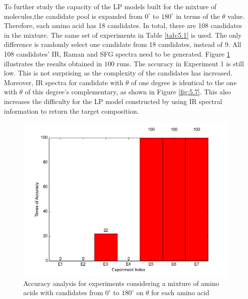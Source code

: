 
To further study the capacity of the LP models built for the mixture of molecules,the candidate pool is expanded from $0^{\circ}$ to $180^{\circ}$ in terms of the $\theta$ value. Therefore, each amino acid has 18 candidates. In total, there are 108 candidates in the mixture. The same set of experiments in Table \ref{tab:5.1} is used. The only difference is randomly select one candidate from 18 candidates, instead of 9. All 108 candidates' IR, Raman and SFG spectra need to be generated. Figure \ref{fig:5.3} illustrates the results obtained in $100$ runs. The accuracy in Experiment 1 is still low. This is not surprising as the complexity of the candidates has increased. Moreover, IR spectra for candidate with $\theta$ of one degree is identical to the one with $\theta$ of this degree's complementary, as shown in Figure \ref{fig:5.7}. This also increases the difficulty for the LP model constructed by using IR spectral information to return the target composition. \\

\begin{figure}[!ht]
\centering
\includegraphics[scale=0.7]{Figures/accuracy_pecent_result10_mixture.png}
\caption{Accuracy analysis for experiments considering a mixture of amino acids with candidates from $0^{\circ}$ to $180^{\circ}$ on $\theta$ for each amino acid} \label{fig:5.3}
\end{figure}


